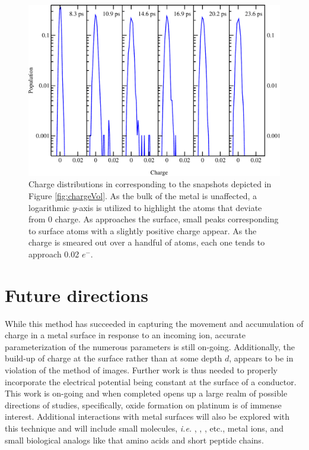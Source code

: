 \begin{figure}
  \centering
  \includegraphics[width=0.9\linewidth]{../figures/chap5/frameChargeDistribution.pdf}
  \caption{Charge distributions in  corresponding to the snapshots
depicted in Figure \ref{fig:chargeVol}. As the bulk of the metal is unaffected, a
logarithmic $y$-axis is utilized to highlight the atoms that deviate from 0
charge. As  approaches the surface, small peaks corresponding to surface
 atoms with a slightly positive charge appear. As the charge is smeared
out over a handful of  atoms, each one tends to approach 0.02 $e^-$.}
\label{fig:chargeHistogram}
\end{figure}

\section{Future directions}
While this method has succeeded in capturing the movement and accumulation of
charge in a metal surface in response to an incoming ion, accurate
parameterization of the numerous parameters is still on-going. Additionally,
the build-up of charge at the surface rather than at some depth $d$, appears to
be in violation of the method of images. Further work is thus needed to
properly incorporate the electrical potential being constant at the surface of
a conductor.  This work is on-going and when completed opens up a large realm
of possible directions of studies, specifically, oxide formation on platinum is
of immense interest. Additional interactions with metal surfaces will also be
explored with this technique and will include small molecules, {\em i.e.}
, , , etc., metal ions, and small biological analogs like
that amino acids and short peptide chains.



